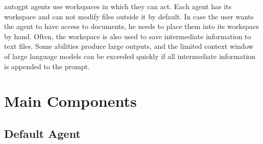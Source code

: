 \documentclass[../main.tex]{subfiles}
\begin{document}
\gls{autogpt} agents use workspaces in which they can act.
Each agent has its workspace and can not modify files outside it by default.
In case the user wants the agent to have access to documents, he needs to place them into its workspace by hand.
Often, the workspace is also used to save intermediate information to text files.
Some abilities produce large outputs,
and the limited context window of large language models can be exceeded quickly
if all intermediate information is appended to the prompt.

\section{Main Components}
\label{sec:default_agent}

\subsection{Default Agent}
\end{document}
